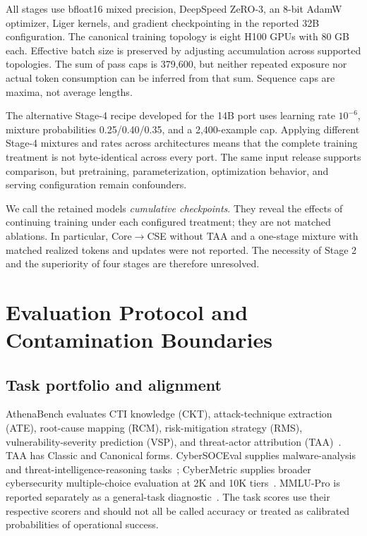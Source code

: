 \documentclass[journal]{IEEEtran}
\begin{document}
All stages use bfloat16 mixed precision, DeepSpeed ZeRO-3, an 8-bit AdamW optimizer, Liger kernels, and gradient checkpointing in the reported 32B configuration. The canonical training topology is eight H100 GPUs with 80 GB each. Effective batch size is preserved by adjusting accumulation across supported topologies. The sum of pass caps is 379,600, but neither repeated exposure nor actual token consumption can be inferred from that sum. Sequence caps are maxima, not average lengths.

The alternative Stage-4 recipe developed for the 14B port uses learning rate $10^{-6}$, mixture probabilities 0.25/0.40/0.35, and a 2,400-example cap. Applying different Stage-4 mixtures and rates across architectures means that the complete training treatment is not byte-identical across every port. The same input release supports comparison, but pretraining, parameterization, optimization behavior, and serving configuration remain confounders.

We call the retained models \emph{cumulative checkpoints}. They reveal the effects of continuing training under each configured treatment; they are not matched ablations. In particular, Core$\rightarrow$CSE without TAA and a one-stage mixture with matched realized tokens and updates were not reported. The necessity of Stage 2 and the superiority of four stages are therefore unresolved.

\section{Evaluation Protocol and Contamination Boundaries}\label{sec:evaluation}
\subsection{Task portfolio and alignment}
AthenaBench evaluates CTI knowledge (CKT), attack-technique extraction (ATE), root-cause mapping (RCM), risk-mitigation strategy (RMS), vulnerability-severity prediction (VSP), and threat-actor attribution (TAA)~\cite{alam2025athenabench}. TAA has Classic and Canonical forms. CyberSOCEval supplies malware-analysis and threat-intelligence-reasoning tasks~\cite{meta2025cybersoceval}; CyberMetric supplies broader cybersecurity multiple-choice evaluation at 2K and 10K tiers~\cite{tihanyi2024cybermetric}. MMLU-Pro is reported separately as a general-task diagnostic~\cite{wang2024mmlupro}. The task scores use their respective scorers and should not all be called accuracy or treated as calibrated probabilities of operational success.
\end{document}
